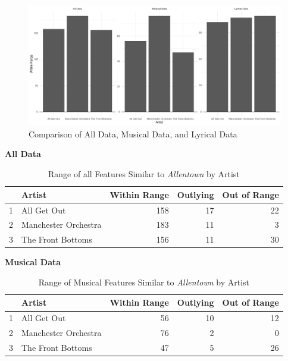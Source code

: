 \documentclass{article}\usepackage[]{graphicx}\usepackage[]{xcolor}
\makeatletter
\def\maxwidth{ %
  \ifdim\Gin@nat@width>\linewidth
    \linewidth
  \else
    \Gin@nat@width
  \fi
}
\newenvironment{knitrout}{}{} %
\makeatother
\begin{document}
\begin{multicols}{2}
\begin{figure}[H]
\begin{center}
\begin{knitrout}
\color{fgcolor}
\includegraphics[width=\maxwidth]{figure/unnamed-chunk-3-1} 
\end{knitrout}
\caption*{Comparison of All Data, Musical Data, and Lyrical Data}
\label{Graph}
\end{center}
\end{figure}

\begin{table}[H]
\begin{center}
\caption*{\textbf{All Data}}
\begin{tabular}{rlrrr}
  \hline
 & Artist & Within Range & Outlying & Out of Range \\ 
  \hline
  1 & All Get Out & 158 & 17 & 22 \\ 
  2 & Manchester Orchestra & 183 & 11 & 3 \\ 
  3 & The Front Bottoms & 156 & 11 & 30 \\ 
   \hline
\end{tabular}
\caption*{Range of all Features Similar to \emph{Allentown} by Artist}
\end{center}
\label{AllTable}
\end{table}

\begin{table}[H]
\centering
\caption*{\textbf{Musical Data}}
\begin{tabular}{rlrrr}
  \hline
 & Artist & Within Range & Outlying & Out of Range \\ 
  \hline
1 & All Get Out & 56 & 10 & 12 \\ 
  2 & Manchester Orchestra & 76 & 2 & 0 \\ 
  3 & The Front Bottoms & 47 & 5 & 26 \\ 
   \hline
\end{tabular}
\caption*{Range of Musical Features Similar to \emph{Allentown} by Artist}
\label{MusicalTable}
\end{table}


\end{multicols}
\end{document}
